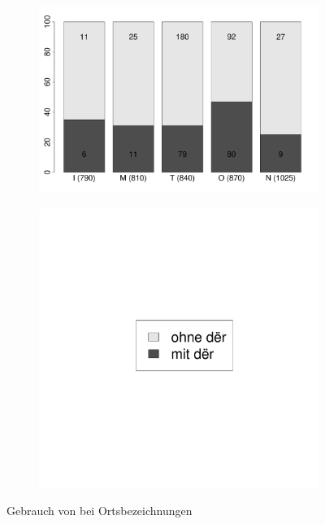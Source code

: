 \begin{figure}
\begin{subfigure}[b]{.6\linewidth}
  \includegraphics[width=10 cm]{generated/images/ort}
\end{subfigure}%
\begin{subfigure}[b]{.1\linewidth}
  \includegraphics[height=.25\textheight]{generated/images/ort-legende}
\end{subfigure}

\caption{Gebrauch von  bei Ortsbezeichnungen}
  \label{fig:bel:orte}
\end{figure} 


